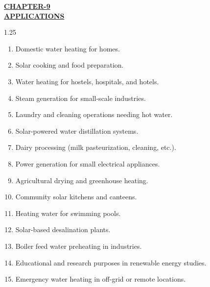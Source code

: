 \begin{center}
  {\fontsize{15}{18}\selectfont \bfseries \textcolor{red!80!black}{\underline{CHAPTER-9}}}\\[2mm]
  {\fontsize{16}{20}\selectfont \bfseries \textcolor{red!80!black}{\underline{APPLICATIONS}}}\\[6mm]
\end{center}

\begin{spacing}{1.25}
{\fontsize{10.5}{14.5}\selectfont
\begin{enumerate}[leftmargin=8mm, itemsep=2.2mm]
  \item Domestic water heating for homes.
  \item Solar cooking and food preparation.
  \item Water heating for hostels, hospitals, and hotels.
  \item Steam generation for small-scale industries.
  \item Laundry and cleaning operations needing hot water.
  \item Solar-powered water distillation systems.
  \item Dairy processing (milk pasteurization, cleaning, etc.).
  \item Power generation for small electrical appliances.
  \item Agricultural drying and greenhouse heating.
  \item Community solar kitchens and canteens.
  \item Heating water for swimming pools.
  \item Solar-based desalination plants.
  \item Boiler feed water preheating in industries.
  \item Educational and research purposes in renewable energy studies.
  \item Emergency water heating in off-grid or remote locations.
\end{enumerate}
}
\end{spacing}
\clearpage
